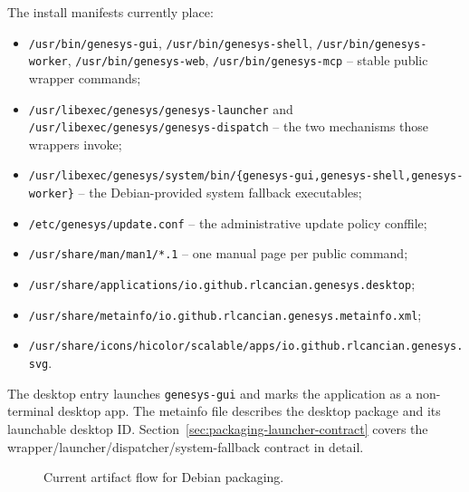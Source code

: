The install manifests currently place:
\begin{itemize}
\item \texttt{/usr/bin/genesys-gui}, \texttt{/usr/bin/genesys-shell},
  \texttt{/usr/bin/genesys-worker}, \texttt{/usr/bin/genesys-web},
  \texttt{/usr/bin/genesys-mcp} -- stable public wrapper commands;
\item \texttt{/usr/libexec/genesys/genesys-launcher} and
  \texttt{/usr/libexec/genesys/genesys-dispatch} -- the two mechanisms those
  wrappers invoke;
\item \texttt{/usr/libexec/genesys/system/bin/\{genesys-gui,genesys-shell,genesys-worker\}}
  -- the Debian-provided system fallback executables;
\item \texttt{/etc/genesys/update.conf} -- the administrative update policy
  conffile;
\item \texttt{/usr/share/man/man1/*.1} -- one manual page per public command;
\item \texttt{/usr/share/applications/io.github.rlcancian.genesys.desktop};
\item \texttt{/usr/share/metainfo/io.github.rlcancian.genesys.metainfo.xml};
\item \texttt{/usr/share/icons/hicolor/scalable/apps/io.github.rlcancian.genesys.svg}.
\end{itemize}

The desktop entry launches \texttt{genesys-gui} and marks the application as a
non-terminal desktop app. The metainfo file describes the desktop package and
its launchable desktop ID. Section~\ref{sec:packaging-launcher-contract}
covers the wrapper/launcher/dispatcher/system-fallback contract in detail.

\begin{figure}[htbp]
\centering
\caption{Current artifact flow for Debian packaging.}
\label{fig:packaging-artifact-flow}
\end{figure}

